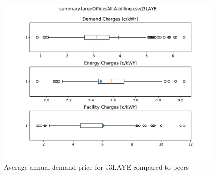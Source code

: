 \documentclass[11pt]{article}
\begin{document}
\lipsum[1][1-7]

\begin{figure}[!h]
\centering
\includegraphics[width=\columnwidth, page=1, trim=0in 3.8in 0in 0.5in, clip]{visuals/J3LAYE.whiskerchart.pdf}
\caption{Average annual demand price for J3LAYE compared to peers}
\label{fig:PeerCompDmnd}
\end{figure}
\end{document}
